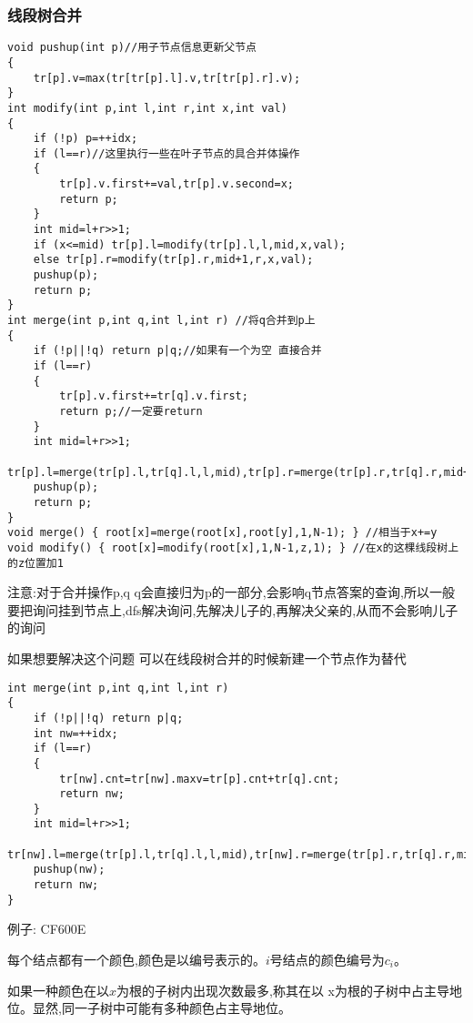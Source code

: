 \documentclass[a4paper]{ctexart}
\begin{document}
\subsubsection{线段树合并}
\begin{lstlisting}
void pushup(int p)//用子节点信息更新父节点
{
	tr[p].v=max(tr[tr[p].l].v,tr[tr[p].r].v);
}
int modify(int p,int l,int r,int x,int val)
{
	if (!p) p=++idx;
	if (l==r)//这里执行一些在叶子节点的具合并体操作
	{
		tr[p].v.first+=val,tr[p].v.second=x;
		return p;
	}
	int mid=l+r>>1;
	if (x<=mid) tr[p].l=modify(tr[p].l,l,mid,x,val);
	else tr[p].r=modify(tr[p].r,mid+1,r,x,val);
	pushup(p);
	return p;
}
int merge(int p,int q,int l,int r) //将q合并到p上
{
	if (!p||!q) return p|q;//如果有一个为空 直接合并
	if (l==r)
	{
		tr[p].v.first+=tr[q].v.first;
		return p;//一定要return
	}
	int mid=l+r>>1;
	tr[p].l=merge(tr[p].l,tr[q].l,l,mid),tr[p].r=merge(tr[p].r,tr[q].r,mid+1,r);
	pushup(p);
	return p;
}
void merge() { root[x]=merge(root[x],root[y],1,N-1); } //相当于x+=y
void modify() { root[x]=modify(root[x],1,N-1,z,1); } //在x的这棵线段树上的z位置加1
\end{lstlisting}
注意:对于合并操作p,q \quad q会直接归为p的一部分,会影响q节点答案的查询,所以一般要把询问挂到节点上,dfs解决询问,先解决儿子的,再解决父亲的,从而不会影响儿子的询问

如果想要解决这个问题 可以在线段树合并的时候新建一个节点作为替代
\begin{lstlisting}
int merge(int p,int q,int l,int r)
{
	if (!p||!q) return p|q;
	int nw=++idx;
	if (l==r)
	{
		tr[nw].cnt=tr[nw].maxv=tr[p].cnt+tr[q].cnt;
		return nw;
	}
	int mid=l+r>>1;
	tr[nw].l=merge(tr[p].l,tr[q].l,l,mid),tr[nw].r=merge(tr[p].r,tr[q].r,mid+1,r);
	pushup(nw);
	return nw;
}
\end{lstlisting}

例子: CF600E

每个结点都有一个颜色,颜色是以编号表示的。$i$号结点的颜色编号为$c_i$。

如果一种颜色在以$x$为根的子树内出现次数最多,称其在以 x为根的子树中占主导地位。显然,同一子树中可能有多种颜色占主导地位。
\end{document}
